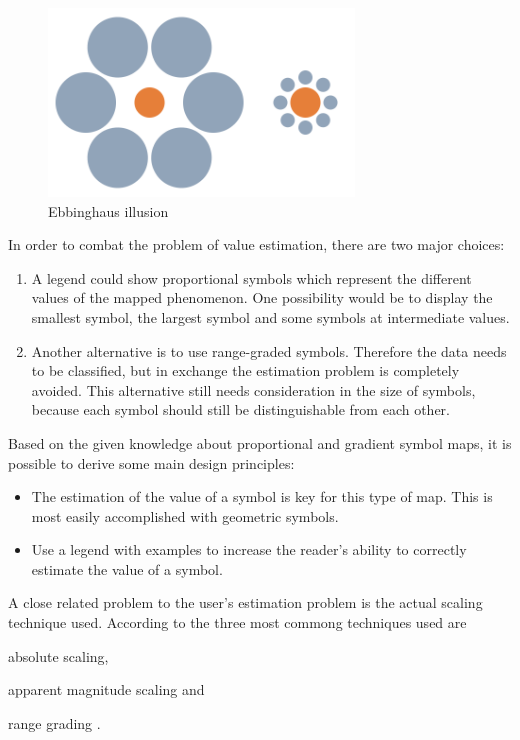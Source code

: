 \begin{figure}[!htb]
\centering
\includegraphics[height=5cm,keepaspectratio]{images/psm/ebbinghaus.png}
\caption[
    Ebbinghaus illusion, Urldate: 07.2016 \newline
    \small\texttt{\url{https://upload.wikimedia.org/wikipedia/commons/b/bc/Mond-vergleich.svg}}
]{Ebbinghaus illusion}
\label{fig:ebbinghaus}
\end{figure}

In order to combat the problem of value estimation, there are two major choices:
\begin{enumerate}
\item A legend could show proportional symbols which represent the different values of the mapped phenomenon. One possibility would be to display the smallest symbol, the largest symbol and some symbols at intermediate values.
\item Another alternative is to use range-graded symbols. Therefore the data needs to be classified, but in exchange the estimation problem is completely avoided. This alternative still needs consideration in the size of symbols, because each symbol should still be distinguishable from each other.
\end{enumerate}

Based on the given knowledge about proportional and gradient symbol maps, it is possible to derive some main design principles:
\begin{itemize}
\item The estimation of the value of a symbol is key for this type of map. This is most easily accomplished with geometric symbols.
\item Use a legend with examples to increase the reader's ability to correctly estimate the value of a symbol.
\end{itemize}

A close related problem to the user's estimation problem is the actual scaling technique used. According to \citeauthor{Dent2008} the three most commong techniques used are
\begin{enumerate*}[label={(\arabic*)]
\item absolute scaling,
\item apparent magnitude scaling and
\item range grading .
\end{enumerate*}

